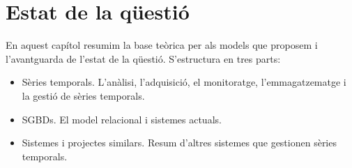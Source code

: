 \chapter{Estat de la qüestió} 
\label{cap:estat}


En aquest capítol resumim la base teòrica per als models que proposem
i l'avantguarda de l'estat de la qüestió. S'estructura en tres parts:

\begin{itemize}

\item Sèries temporals. L'anàlisi, l'adquisició, el monitoratge,
  l'emmagatzematge i la gestió de sèries temporals.

\item \Glspl{SGBD}. El model relacional i sistemes
  actuals.

\item Sistemes i projectes similars. Resum d'altres sistemes que gestionen
  sèries temporals.

\end{itemize}











  
















